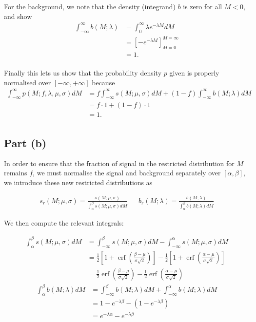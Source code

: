 \documentclass[12pt]{article}
\DeclareMathOperator{\erf}{erf}
\begin{document}
For the background, we note that the density (integrand) $b$ is zero for all $M<0$, and show
\begin{align*}
    \int_{-\infty}^\infty b(M;\lambda) & = \int_0^\infty \lambda e^{-\lambda M}dM \\
    & = \left[-e^{-\lambda M}\right]_{M=0}^{M=\infty} \\
    & = 1. \\
\end{align*}

Finally this lets us show that the probability density $p$ given is properly normalised over $[-\infty,+\infty]$ because
\begin{align*}
    \int_{-\infty}^\infty p(M; f,\lambda,\mu,\sigma)dM & = f\int_{-\infty}^\infty s(M;\mu, \sigma)dM + (1-f)\int_{-\infty}^\infty b(M;\lambda)dM \\
    & = f\cdot 1 + (1-f)\cdot 1\\
    & = 1. \\
\end{align*}

\subsection*{Part (b)}

In order to ensure that the fraction of signal in the restricted distribution for $M$ remains $f$, we must normalise the signal and background separately over $[\alpha,\beta]$, we introduce these new restricted distributions as

\begin{align*}
    s_r(M;\mu,\sigma) = \frac{s(M;\mu,\sigma)}{\int_\alpha^\beta s(M;\mu,\sigma)dM} && b_r(M;\lambda) = \frac{b(M;\lambda)}{\int_\alpha^\beta b(M;\lambda)dM}
\end{align*}

We then compute the relevant integrals:

\begin{align*}
    \int_\alpha^\beta s(M;\mu,\sigma)dM & = \int_{-\infty}^\beta s(M;\mu,\sigma)dM - \int_{-\infty}^\alpha s(M;\mu,\sigma)dM \\
    & = \frac{1}{2}\left[1 + \erf\left(\frac{\beta - \mu}{\sigma\sqrt{2}}\right)\right] - \frac{1}{2}\left[1 + \erf\left(\frac{\alpha - \mu}{\sigma\sqrt{2}}\right)\right] \\
    & = \frac{1}{2}\erf\left(\frac{\beta - \mu}{\sigma\sqrt{2}}\right) - \frac{1}{2}\erf\left(\frac{\alpha - \mu}{\sigma\sqrt{2}}\right)
\end{align*}
\begin{align*}
    \int_\alpha^\beta b(M;\lambda)dM & = \int_{-\infty}^\beta b(M;\lambda)dM + \int_{-\infty}^\alpha b(M;\lambda)dM \\
    & = 1 - e^{-\lambda\beta} - (1 - e^{-\lambda\beta}) \\
    & = e^{-\lambda\alpha} - e^{-\lambda\beta}
\end{align*}
\end{document}
